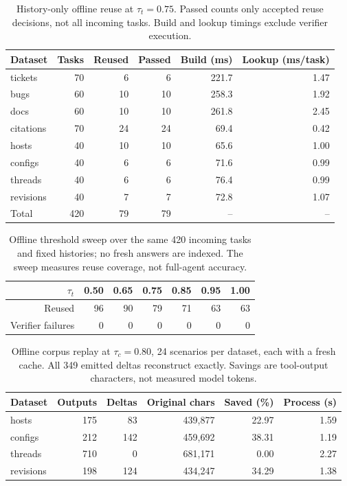 \begin{table}[ht]
\centering\small
\begin{tabular}{lrrrrr}
\toprule
Dataset & Tasks & Reused & Passed & Build (ms) & Lookup (ms/task) \\
\midrule
tickets & 70 & 6 & 6 & 221.7 & 1.47 \\
bugs & 60 & 10 & 10 & 258.3 & 1.92 \\
docs & 60 & 10 & 10 & 261.8 & 2.45 \\
citations & 70 & 24 & 24 & 69.4 & 0.42 \\
hosts & 40 & 10 & 10 & 65.6 & 1.00 \\
configs & 40 & 6 & 6 & 71.6 & 0.99 \\
threads & 40 & 6 & 6 & 76.4 & 0.99 \\
revisions & 40 & 7 & 7 & 72.8 & 1.07 \\
\midrule
Total & 420 & 79 & 79 & -- & -- \\
\bottomrule
\end{tabular}
\caption{History-only offline reuse at $\tau_t=0.75$. Passed counts only accepted reuse decisions, not all incoming tasks. Build and lookup timings exclude verifier execution.}
\label{tab:tasks}
\end{table}
\begin{table}[ht]
\centering\small
\begin{tabular}{rrrrrrr}
\toprule
$\tau_t$ & 0.50 & 0.65 & 0.75 & 0.85 & 0.95 & 1.00 \\
\midrule
Reused & 96 & 90 & 79 & 71 & 63 & 63 \\
Verifier failures & 0 & 0 & 0 & 0 & 0 & 0 \\
\bottomrule
\end{tabular}
\caption{Offline threshold sweep over the same 420 incoming tasks and fixed histories; no fresh answers are indexed. The sweep measures reuse coverage, not full-agent accuracy.}
\label{tab:threshold}
\end{table}
\begin{table}[ht]
\centering\small
\begin{tabular}{lrrrrr}
\toprule
Dataset & Outputs & Deltas & Original chars & Saved (\%) & Process (s) \\
\midrule
hosts & 175 & 83 & 439,877 & 22.97 & 1.59 \\
configs & 212 & 142 & 459,692 & 38.31 & 1.19 \\
threads & 710 & 0 & 681,171 & 0.00 & 2.27 \\
revisions & 198 & 124 & 434,247 & 34.29 & 1.38 \\
\bottomrule
\end{tabular}
\caption{Offline corpus replay at $\tau_c=0.80$, 24 scenarios per dataset, each with a fresh cache. All 349 emitted deltas reconstruct exactly. Savings are tool-output characters, not measured model tokens.}
\label{tab:content}
\end{table}
